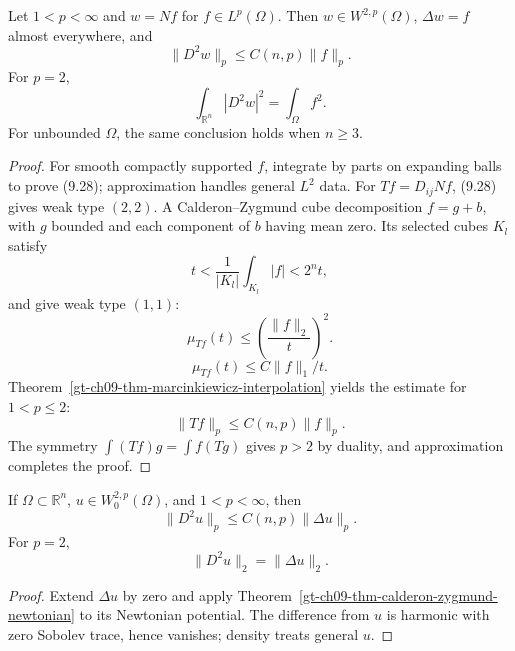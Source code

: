 \begin{theorem}
\label{gt-ch09-thm-calderon-zygmund-newtonian}
Let $1<p<\infty$ and $w=Nf$ for $f\in L^p(\Omega)$.  Then
$w\in W^{2,p}(\Omega)$, $\Delta w=f$ almost everywhere, and
\begin{equation}\tag{9.27}
\|D^2w\|_p\le C(n,p)\|f\|_p.
\end{equation}
For $p=2$,
\begin{equation}\tag{9.28}
\int_{\mathbb R^n}|D^2w|^2=\int_\Omega f^2.
\end{equation}
For unbounded $\Omega$, the same conclusion holds when $n\ge3$.
\end{theorem}
\begin{proof}
\sketch For smooth compactly supported $f$, integrate by parts on expanding
balls to prove (9.28); approximation handles general $L^2$ data.  For
$Tf=D_{ij}Nf$, (9.28) gives weak type $(2,2)$.  A Calderon--Zygmund cube
decomposition $f=g+b$, with $g$ bounded and each component of $b$ having
mean zero. Its selected cubes $K_l$ satisfy
\begin{equation}
\tag{9.31}
t<\frac1{|K_l|}\int_{K_l}|f|<2^nt,
\end{equation}
and give weak type $(1,1)$:
\[
\mu_{Tf}(t)\le\left(\frac{\|f\|_2}{t}\right)^2.\tag{9.29}
\]
\[
\mu_{Tf}(t)\le C\|f\|_1/t.\tag{9.30}
\]
Theorem~\ref{gt-ch09-thm-marcinkiewicz-interpolation} yields the estimate for
$1<p\le2$:
\begin{equation}
\tag{9.32}
\|Tf\|_p\leq C(n,p)\|f\|_p.
\end{equation}
The symmetry
$\int(Tf)g=\int f(Tg)$ gives $p>2$ by duality, and approximation completes
the proof.
\end{proof}

\begin{corollary}
\label{gt-ch09-cor-calderon-zygmund-poisson}
If $\Omega\subset\mathbb R^n$, $u\in W^{2,p}_0(\Omega)$, and
$1<p<\infty$, then
\begin{equation}\tag{9.33}
\|D^2u\|_p\le C(n,p)\|\Delta u\|_p.
\end{equation}
For $p=2$,
\begin{equation}\tag{9.34}
\|D^2u\|_2=\|\Delta u\|_2.
\end{equation}
\end{corollary}
\begin{proof}
\sketch Extend $\Delta u$ by zero and apply
Theorem~\ref{gt-ch09-thm-calderon-zygmund-newtonian} to its Newtonian
potential.  The difference from $u$ is harmonic with zero Sobolev trace, hence
vanishes; density treats general $u$.
\end{proof}

